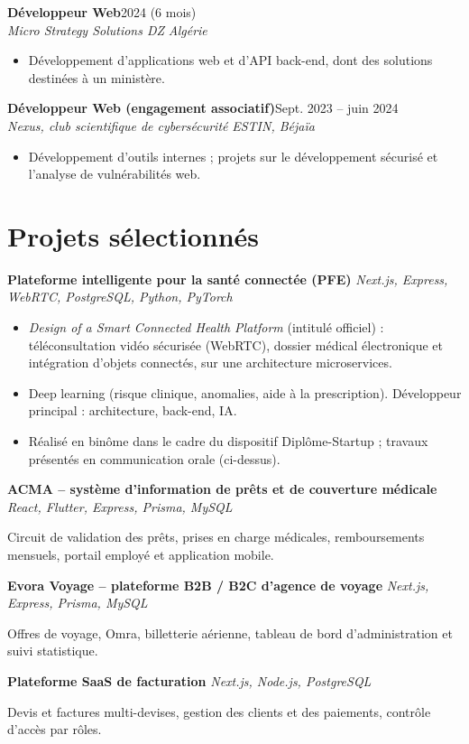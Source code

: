 \documentclass[10pt,a4paper]{article}
\newcommand{\entree}[4]{%
  \textbf{#1}\hfill{\small #2}\\
  {\itshape #3}\hfill{\small\itshape\color{muted} #4}\par}
\newcommand{\projet}[2]{%
  \textbf{#1}\hfill{\small\itshape\color{muted} #2}\par}
\begin{document}
\entree{Développeur Web}{2024 (6 mois)}{Micro Strategy Solutions DZ}{Algérie}
\begin{itemize}
  \item Développement d'applications web et d'API back-end, dont des solutions destinées à un ministère.
\end{itemize}


\entree{Développeur Web (engagement associatif)}{Sept. 2023 -- juin 2024}{Nexus, club scientifique de cybersécurité}{ESTIN, Béjaïa}
\begin{itemize}
  \item Développement d'outils internes ; projets sur le développement sécurisé et l'analyse de vulnérabilités web.
\end{itemize}

\section{Projets sélectionnés}

\projet{Plateforme intelligente pour la santé connectée (PFE)}{Next.js, Express, WebRTC, PostgreSQL, Python, PyTorch}
\begin{itemize}
  \item \emph{Design of a Smart Connected Health Platform} (intitulé officiel) : téléconsultation vidéo sécurisée (WebRTC),
        dossier médical électronique et intégration d'objets connectés, sur une architecture microservices.
  \item Deep learning (risque clinique, anomalies, aide à la prescription). Développeur principal : architecture, back-end, IA.
  \item Réalisé en binôme dans le cadre du dispositif Diplôme-Startup ; travaux présentés en communication orale (ci-dessus).
\end{itemize}


\projet{ACMA -- système d'information de prêts et de couverture médicale}{React, Flutter, Express, Prisma, MySQL}
{\small Circuit de validation des prêts, prises en charge médicales, remboursements mensuels, portail employé et application mobile.}\par


\projet{Evora Voyage -- plateforme B2B / B2C d'agence de voyage}{Next.js, Express, Prisma, MySQL}
{\small Offres de voyage, Omra, billetterie aérienne, tableau de bord d'administration et suivi statistique.}\par


\projet{Plateforme SaaS de facturation}{Next.js, Node.js, PostgreSQL}
{\small Devis et factures multi-devises, gestion des clients et des paiements, contrôle d'accès par rôles.}\par
\end{document}

